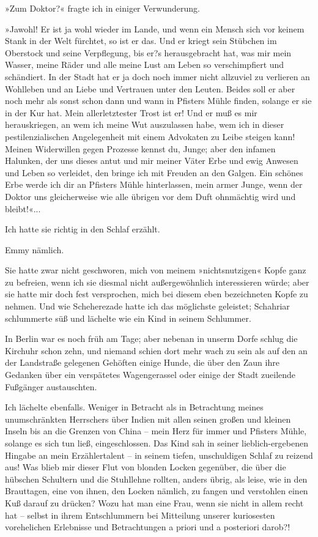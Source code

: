 »Zum Doktor?« fragte ich in einiger Verwunderung.

»Jawohl! Er ist ja wohl wieder im Lande, und wenn ein Mensch sich
vor keinem Stank in der Welt fürchtet, so ist er das. Und er kriegt
sein Stübchen im Oberstock und seine Verpflegung, bis er?s
herausgebracht hat, was mir mein Wasser, meine Räder und alle meine
Lust am Leben so verschimpfiert und schändiert. In der Stadt hat er
ja doch noch immer nicht allzuviel zu verlieren an Wohlleben und an
Liebe und Vertrauen unter den Leuten. Beides soll er aber noch mehr
als sonst schon dann und wann in Pfisters Mühle finden, solange er
sie in der Kur hat. Mein allerletztester Trost ist er! Und er muß
es mir herauskriegen, an wem ich meine Wut auszulassen habe, wem
ich in dieser pestilenzialischen Angelegenheit mit einem Advokaten
zu Leibe steigen kann! Meinen Widerwillen gegen Prozesse kennst du,
Junge; aber den infamen Halunken, der uns dieses antut und mir
meiner Väter Erbe und ewig Anwesen und Leben so verleidet, den
bringe ich mit Freuden an den Galgen. Ein schönes Erbe werde ich
dir an Pfisters Mühle hinterlassen, mein armer Junge, wenn der
Doktor uns gleicherweise wie alle übrigen vor dem Duft ohnmächtig
wird und bleibt!«...

Ich hatte sie richtig in den Schlaf erzählt.

Emmy nämlich.

Sie hatte zwar nicht geschworen, mich von meinem »nichtsnutzigen«
Kopfe ganz zu befreien, wenn ich sie diesmal nicht außergewöhnlich
interessieren würde; aber sie hatte mir doch fest versprochen, mich
bei diesem eben bezeichneten Kopfe zu nehmen. Und wie Scheherezade
hatte ich das möglichste geleistet; Schahriar schlummerte süß und
lächelte wie ein Kind in seinem Schlummer.

In Berlin war es noch früh am Tage; aber nebenan in unserm Dorfe
schlug die Kirchuhr schon zehn, und niemand schien dort mehr wach
zu sein als auf den an der Landstraße gelegenen Gehöften einige
Hunde, die über den Zaun ihre Gedanken über ein verspätetes
Wagengerassel oder einige der Stadt zueilende Fußgänger
austauschten.

Ich lächelte ebenfalls. Weniger in Betracht als in Betrachtung
meines unumschränkten Herrschers über Indien mit allen seinen
großen und kleinen Inseln bis an die Grenzen von China – mein Herz
für immer und Pfisters Mühle, solange es sich tun ließ,
eingeschlossen. Das Kind sah in seiner lieblich-ergebenen Hingabe
an mein Erzählertalent – in seinem tiefen, unschuldigen Schlaf zu
reizend aus! Was blieb mir dieser Flut von blonden Locken
gegenüber, die über die hübschen Schultern und die Stuhllehne
rollten, anders übrig, als leise, wie in den Brauttagen, eine von
ihnen, den Locken nämlich, zu fangen und verstohlen einen Kuß
darauf zu drücken? Wozu hat man eine Frau, wenn sie nicht in allem
recht hat – selbst in ihrem Entschlummern bei Mitteilung unserer
kuriosesten vorehelichen Erlebnisse und Betrachtungen a priori und
a posteriori darob?!

